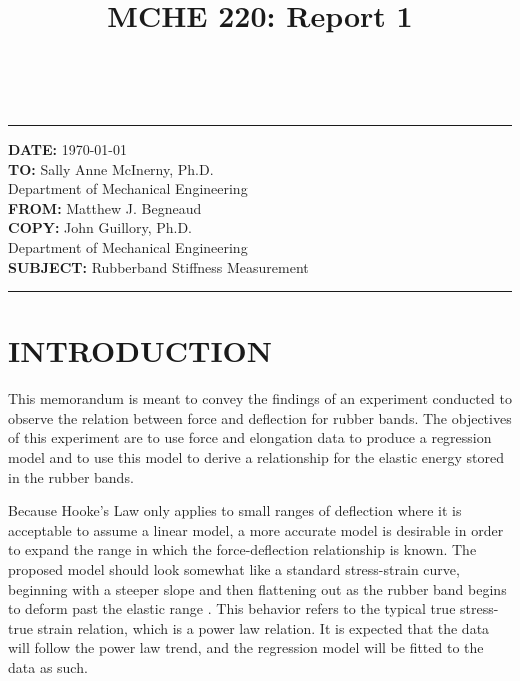 \documentclass[12pt]{article}
\title{MCHE 220: Report 1}
\begin{document}
\fancyhf{}  
  \renewcommand{\headrulewidth}{0pt}
    \pagestyle{plain}
    
\captionsetup[table]{labelsep=space}

\begin{flushleft}
\hrulefill\\\hrule height 1pt
\vspace{5pt}
\textbf{DATE: }\today
\bigskip\\
\textbf{TO: }Sally Anne McInerny, Ph.D.\\ Department of Mechanical Engineering
\bigskip\\
\textbf{FROM: }Matthew J. Begneaud
\bigskip\\
\textbf{COPY: }John Guillory, Ph.D.\\ Department of Mechanical Engineering
\bigskip\\
\textbf{SUBJECT:} Rubberband Stiffness Measurement
\vspace{-10pt}
\end{flushleft}
\hrulefill \hrule height 1pt


\section*{\fontsize{12}{12}\selectfont INTRODUCTION}
This memorandum is meant to convey the findings of an experiment conducted to observe the relation between force and deflection for rubber bands. The objectives of this experiment are to use force and elongation data to produce a regression model and to use this model to derive a relationship for the elastic energy stored in the rubber bands.
\bigskip

Because Hooke's Law only applies to small ranges of deflection where it is acceptable to assume a linear model, a more accurate model is desirable in order to expand the range in which the force-deflection relationship is known. The proposed model should look somewhat like a standard stress-strain curve, beginning with a steeper slope and then flattening out as the rubber band begins to deform past the elastic range \cite{rubberband_writeup}. This behavior refers to the typical true stress-true strain relation, which is a power law relation. It is expected that the data will follow the power law trend, and the regression model will be fitted to the data as such.
\end{document}
